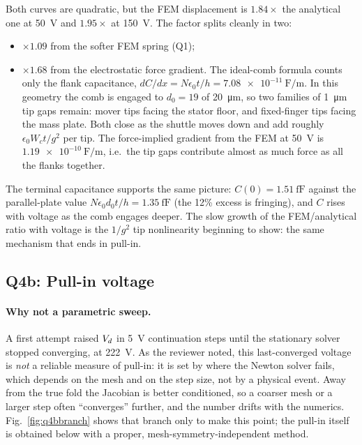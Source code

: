 Both curves are quadratic, but the FEM displacement is $1.84\times$ the
analytical one at \SI{50}{\volt} and $1.95\times$ at \SI{150}{\volt}. The
factor splits cleanly in two:
\begin{itemize}
\item $\times1.09$ from the softer FEM spring (Q1);
\item $\times1.68$ from the electrostatic force gradient. The ideal-comb
  formula counts only the flank capacitance, $dC/dx=N\epsilon_{0}t/h=
  \SI{7.08e-11}{\farad\per\meter}$. In this geometry the comb is engaged to
  $d_{0}=19$ of \SI{20}{\micro\meter}, so two families of
  \SI{1}{\micro\meter} tip gaps remain: mover tips facing the stator floor,
  and fixed-finger tips facing the mass plate. Both close as the shuttle
  moves down and add roughly $\epsilon_{0}W_{c}t/g^{2}$ per tip. The
  force-implied gradient from the FEM at \SI{50}{\volt} is
  $\SI{1.19e-10}{\farad\per\meter}$, i.e.\ the tip gaps contribute almost as
  much force as all the flanks together.
\end{itemize}
The terminal capacitance supports the same picture: $C(0)=\SI{1.51}{\femto\farad}$
against the parallel-plate value $N\epsilon_{0}d_{0}t/h=\SI{1.35}{\femto\farad}$
(the 12\% excess is fringing), and $C$ rises with voltage as the comb engages
deeper. The slow growth of the FEM/analytical ratio with voltage is the
$1/g^{2}$ tip nonlinearity beginning to show: the same mechanism that ends
in pull-in.

\subsection*{Q4b: Pull-in voltage}

{\color{blue}%
\paragraph{Why not a parametric sweep.}
A first attempt raised $V_{d}$ in \SI{5}{\volt} continuation steps until the
stationary solver stopped converging, at \SI{222}{\volt}. As the reviewer
noted, this last-converged voltage is \emph{not} a reliable measure of
pull-in: it is set by where the Newton solver fails, which depends on the mesh
and on the step size, not by a physical event. Away from the true fold the
Jacobian is better conditioned, so a coarser mesh or a larger step often
``converges'' further, and the number drifts with the numerics. Fig.~\ref{fig:q4bbranch}
shows that branch only to make this point; the pull-in itself is obtained below
with a proper, mesh-symmetry-independent method.}

